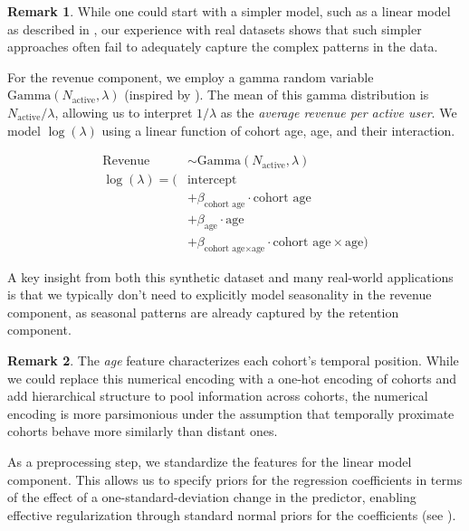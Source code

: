 \documentclass[11pt]{amsart}
\theoremstyle{definition}
\newtheorem{remark}{Remark}
\begin{document}
\begin{remark}
    While one could start with a simpler model, such as a linear model as described in \cite{orduz_revenue_retention},
    our experience with real datasets shows that such simpler approaches often fail to adequately capture the complex
    patterns in the data.
\end{remark}

For the revenue component, we employ a gamma random variable $\text{Gamma}(N_{\text{active}}, \lambda)$ (inspired by
\cite{stucchio2015bayesian}). The mean of this gamma distribution is $N_{\text{active}} / \lambda$, allowing us to interpret
$1 / \lambda$ as the {\em average revenue per active user}. We model $\log(\lambda)$ using a linear function of cohort age,
age, and their interaction.

\begin{align*}
    \text{Revenue}    & \sim \text{Gamma}(N_{\text{active}}, \lambda)                                            \\
    \log(\lambda) = ( & \text{intercept}                                                                         \\
                      & + \beta_{\text{cohort age}} \cdot \text{cohort age}                                      \\
                      & + \beta_{\text{age}} \cdot \text{age}                                                    \\
                      & + \beta_{\text{cohort age} \times \text{age}} \cdot \text{cohort age} \times \text{age})
\end{align*}

A key insight from both this synthetic dataset and many real-world applications is that we typically don't need to explicitly
model seasonality in the revenue component, as seasonal patterns are already captured by the retention component.

\begin{remark}
    The {\em age} feature characterizes each cohort's temporal position. While we could replace this numerical encoding with
    a one-hot encoding of cohorts and add hierarchical structure to pool information across cohorts, the numerical encoding
    is more parsimonious under the assumption that temporally proximate cohorts behave more similarly than distant ones.
\end{remark}

As a preprocessing step, we standardize the features for the linear model component. This allows us to specify priors for the
regression coefficients in terms of the effect of a one-standard-deviation change in the predictor, enabling effective
regularization through standard normal priors for the coefficients (see \cite{orduz_retention_bart}). \\
\end{document}
